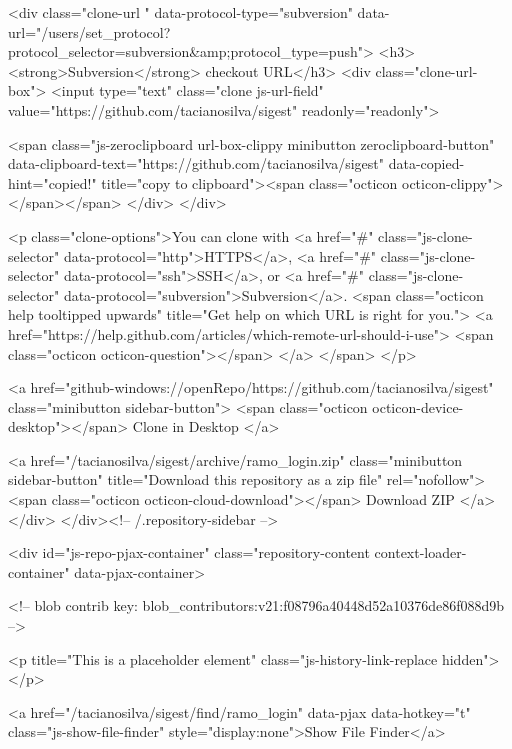   

<div class="clone-url "
  data-protocol-type="subversion"
  data-url="/users/set_protocol?protocol_selector=subversion&amp;protocol_type=push">
  <h3><strong>Subversion</strong> checkout URL</h3>
  <div class="clone-url-box">
    <input type="text" class="clone js-url-field"
           value="https://github.com/tacianosilva/sigest" readonly="readonly">

    <span class="js-zeroclipboard url-box-clippy minibutton zeroclipboard-button" data-clipboard-text="https://github.com/tacianosilva/sigest" data-copied-hint="copied!" title="copy to clipboard"><span class="octicon octicon-clippy"></span></span>
  </div>
</div>


<p class="clone-options">You can clone with
      <a href="#" class="js-clone-selector" data-protocol="http">HTTPS</a>,
      <a href="#" class="js-clone-selector" data-protocol="ssh">SSH</a>,
      or <a href="#" class="js-clone-selector" data-protocol="subversion">Subversion</a>.
  <span class="octicon help tooltipped upwards" title="Get help on which URL is right for you.">
    <a href="https://help.github.com/articles/which-remote-url-should-i-use">
    <span class="octicon octicon-question"></span>
    </a>
  </span>
</p>


  <a href="github-windows://openRepo/https://github.com/tacianosilva/sigest" class="minibutton sidebar-button">
    <span class="octicon octicon-device-desktop"></span>
    Clone in Desktop
  </a>

              <a href="/tacianosilva/sigest/archive/ramo_login.zip"
                 class="minibutton sidebar-button"
                 title="Download this repository as a zip file"
                 rel="nofollow">
                <span class="octicon octicon-cloud-download"></span>
                Download ZIP
              </a>
            </div>
        </div><!-- /.repository-sidebar -->

        <div id="js-repo-pjax-container" class="repository-content context-loader-container" data-pjax-container>
          


<!-- blob contrib key: blob_contributors:v21:f08796a40448d52a10376de86f088d9b -->

<p title="This is a placeholder element" class="js-history-link-replace hidden"></p>

<a href="/tacianosilva/sigest/find/ramo_login" data-pjax data-hotkey="t" class="js-show-file-finder" style="display:none">Show File Finder</a>

